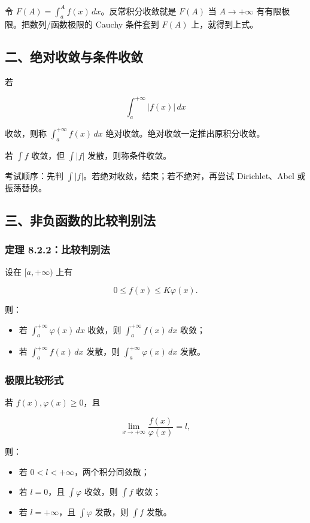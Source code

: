 令 \(F(A)=\int_a^A f(x)\,dx\)。反常积分收敛就是 \(F(A)\) 当 \(A\to+\infty\) 有有限极限。把数列/函数极限的 Cauchy 条件套到 \(F(A)\) 上，就得到上式。

\subsection*{二、绝对收敛与条件收敛}

若

\[
      \int_a^{+\infty}|f(x)|\,dx
    \]

收敛，则称 \(\int_a^{+\infty}f(x)\,dx\) 绝对收敛。绝对收敛一定推出原积分收敛。

若 \(\int f\) 收敛，但 \(\int |f|\) 发散，则称条件收敛。

\begin{notebox}
考试顺序：先判 \(\int |f|\)。若绝对收敛，结束；若不绝对，再尝试 Dirichlet、Abel 或振荡替换。
\end{notebox}

\subsection*{三、非负函数的比较判别法}

\subsubsection*{定理 8.2.2：比较判别法}

设在 \([a,+\infty)\) 上有

\[
      0\le f(x)\le K\varphi(x).
    \]

则：

\begin{itemize}
 \item 若 \(\int_a^{+\infty}\varphi(x)\,dx\) 收敛，则 \(\int_a^{+\infty}f(x)\,dx\) 收敛；
 \item 若 \(\int_a^{+\infty}f(x)\,dx\) 发散，则 \(\int_a^{+\infty}\varphi(x)\,dx\) 发散。
 \end{itemize}

\subsubsection*{极限比较形式}

若 \(f(x),\varphi(x)\ge0\)，且

\[
      \lim_{x\to+\infty}\frac{f(x)}{\varphi(x)}=l,
    \]

则：

\begin{itemize}
 \item 若 \(0<l<+\infty\)，两个积分同敛散；
 \item 若 \(l=0\)，且 \(\int\varphi\) 收敛，则 \(\int f\) 收敛；
 \item 若 \(l=+\infty\)，且 \(\int\varphi\) 发散，则 \(\int f\) 发散。
 \end{itemize}

